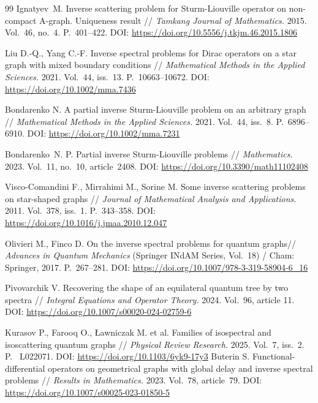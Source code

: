 \documentclass[a4paper, 12pt] {article}
\theoremstyle{plain}
\theoremstyle{remark}
\theoremstyle{plain}
\theoremstyle{definition}
\numberwithin{equation}{section}
\begin{document}
\begin{thebibliography}{99}
 Ignatyev~M. Inverse scattering problem for Sturm-Liouville operator on non-compact A-graph. Uniqueness result // {\it Tamkang Journal of Mathematics.} 2015. Vol.~46, no.~4. P.~401--422. DOI: \url{https://doi.org/10.5556/j.tkjm.46.2015.1806}

 Liu D.-Q., Yang C.-F. Inverse spectral problems for Dirac operators on a star graph with
mixed boundary conditions // {\it Mathematical Methods in the Applied Sciences.} 2021. Vol.~44, iss.~13. P.~10663--10672. DOI: \url{https://doi.org/10.1002/mma.7436}

 Bondarenko N. A partial inverse Sturm-Liouville problem on an arbitrary graph // {\it Mathematical Methods in the Applied Sciences.} 2021. Vol.~44, iss.~8. P.~6896--6910. DOI: \url{https://doi.org/10.1002/mma.7231}

 Bondarenko~N. P. Partial inverse Sturm-Liouville problems // {\it Mathematics.} 2023. Vol.~11, no.~10, article~2408. DOI: \url{https://doi.org/10.3390/math11102408}


 Visco-Comandini F., Mirrahimi M., Sorine M.
Some inverse scattering problems on star-shaped graphs // {\it Journal of Mathematical Analysis and Applications.} 2011.
Vol.~378, iss.~1. P.~343--358.
DOI: \url{https://doi.org/10.1016/j.jmaa.2010.12.047}

 Olivieri M., Finco D. On the inverse spectral problems for quantum graphs// {\it Advances in Quantum Mechanics}  (Springer INdAM Series, Vol.~18) / Cham: Springer, 2017. P.~267--281.
DOI: \url{https://doi.org/10.1007/978-3-319-58904-6\_16}

  Pivovarchik V. Recovering the shape of an equilateral quantum tree by two spectra // {\it Integral Equations and Operator Theory.} 2024. Vol.~96, article 11. DOI: \url{https://doi.org/10.1007/s00020-024-02759-6}

 Kurasov P., Farooq O., \L{}awniczak M. et al. Families of isospectral and isoscattering quantum graphs // {\it
 Physical Review Research.} 2025. Vol.~7, iss.~2. P.~ L022071. DOI: \url{https://doi.org/10.1103/6yk9-17y3}
%
 Buterin S. Functional-differential operators on geometrical graphs with global delay and inverse spectral problems // {\it Results in Mathematics.} 2023. Vol.~78, article~79. DOI: \url{https://doi.org/10.1007/s00025-023-01850-5}


\end{thebibliography}
\end{document}
